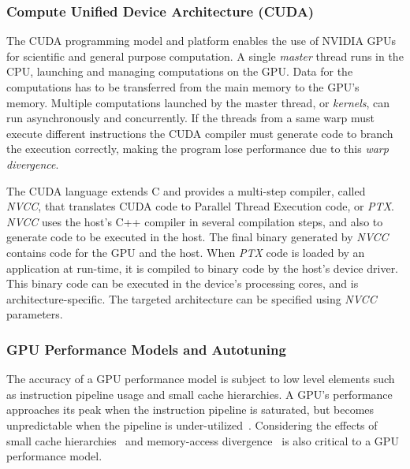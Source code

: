 \subsubsection{Compute Unified Device Architecture (CUDA)}

The CUDA programming model and platform enables the use of NVIDIA GPUs for
scientific and general purpose computation.  A single \textit{master} thread
runs in the CPU, launching and managing computations on the GPU.  Data for the
computations has to be transferred from the main memory to the GPU's memory.
Multiple computations launched by the master thread, or \textit{kernels}, can
run asynchronously and concurrently. If the threads from a same warp must
execute different instructions the CUDA compiler must generate code to branch
the execution correctly, making the program lose performance due to this
\textit{warp divergence}.

The CUDA language extends C and provides a multi-step compiler, called
\textit{NVCC}, that translates CUDA code to Parallel Thread Execution code, or
\textit{PTX}.  \textit{NVCC} uses the host's C++ compiler in several
compilation steps, and also to generate code to be executed in the host. The
final binary generated by \textit{NVCC} contains code for the GPU and the host.
When \textit{PTX} code is loaded by an application at run-time, it is compiled
to binary code by the host's device driver.  This binary code can be executed
in the device's processing cores, and is architecture-specific.  The targeted
architecture can be specified using \textit{NVCC} parameters.

\subsubsection{GPU Performance Models and Autotuning}

The accuracy of a GPU performance model is subject to low level elements such
as instruction pipeline usage and small cache hierarchies. A GPU's performance
approaches its peak when the instruction pipeline is saturated, but becomes
unpredictable when the pipeline is
under-utilized~\cite{zhang2011quantitative,amaris2015simple}.  Considering the
effects of small cache hierarchies~\cite{dao2015performance,picchi2015impact}
and memory-access
divergence~\cite{sampaio2013divergence,baghsorkhi2010adaptive} is also critical
to a GPU performance model.


